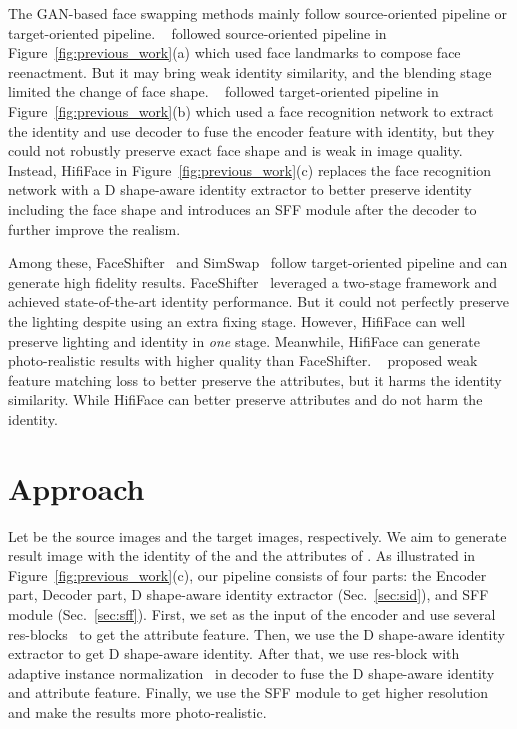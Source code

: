 \documentclass{article}
\begin{document}
The GAN-based face swapping methods mainly follow source-oriented pipeline or target-oriented pipeline. ~\cite{Nirkin2019fsgan,jiang2020deeperforensics} followed source-oriented pipeline in Figure~\ref{fig:previous_work}(a) which used face landmarks to compose face reenactment. But it may bring weak identity similarity, and the blending stage limited the change of face shape. ~\cite{liu2019identity,chen2020simswap,li2019faceshifter} followed target-oriented pipeline in Figure~\ref{fig:previous_work}(b) which used a face recognition network to extract the identity and use decoder to fuse the encoder feature with identity, but they could not robustly preserve exact face shape and is weak in image quality.
Instead, HifiFace in Figure~\ref{fig:previous_work}(c) replaces the face recognition network with a D shape-aware identity extractor to better preserve identity including the face shape and introduces an SFF module after the decoder to further improve the realism.


Among these, FaceShifter~\cite{li2019faceshifter} and SimSwap~\cite{chen2020simswap} follow target-oriented pipeline and can generate high fidelity results. FaceShifter~\cite{li2019faceshifter} leveraged a two-stage framework and achieved state-of-the-art identity performance. But it could not perfectly preserve the lighting despite using an extra fixing stage. However, HifiFace can well preserve lighting and identity in \textit{one} stage. Meanwhile, HifiFace can generate photo-realistic results with higher quality than FaceShifter.  
~\cite{chen2020simswap} proposed weak feature matching loss to better preserve the attributes, but it harms the identity similarity. While HifiFace can better preserve attributes and do not harm the identity.  






\section{Approach}
Let  be the source images and  the target images, respectively. We aim to generate result image  with the identity of the  and the attributes of . As illustrated in Figure~\ref{fig:previous_work}(c), our pipeline consists of four parts: the Encoder part, Decoder part, D shape-aware identity extractor (Sec.~\ref{sec:sid}), and SFF module (Sec.~\ref{sec:sff}). 
First, we set  as the input of the encoder and use several res-blocks~\cite{he2016deep} to get the attribute feature. Then, we use the D shape-aware identity extractor to get D shape-aware identity. 
After that, we use res-block with adaptive instance normalization~\cite{karras2019style} in decoder to fuse the D shape-aware identity and attribute feature. 
Finally, we use the SFF module to get higher resolution and make the results more photo-realistic.  
\end{document}
